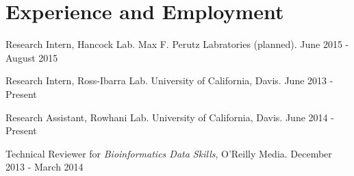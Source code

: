 \documentclass[letterpaper]{article}
\renewenvironment{itemize}{
  \begin{list}{}{
    \setlength{\leftmargin}{1.5em}
  }
}{
  \end{list}
}
\begin{document}
\section*{Experience and Employment}
\begin{itemize}
\item Research Intern, Hancock Lab. Max F. Perutz Labratories (planned). \hfill June 2015 - August 2015
\item Research Intern, Ross-Ibarra Lab. University of California, Davis. \hfill June 2013 - Present
\item Research Assistant, Rowhani Lab. University of California, Davis. \hfill June 2014 - Present
\item Technical Reviewer for \textit{Bioinformatics Data Skills}, O'Reilly Media. \hfill December 2013 - March 2014

\end{itemize}
\end{document}
